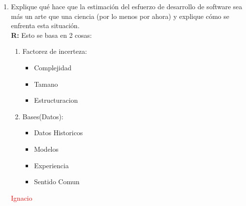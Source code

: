 \begin{enumerate}
	\item Explique qué hace que la estimación del esfuerzo de desarrollo de software sea más un arte que una ciencia (por lo menos por ahora) y explique cómo se enfrenta esta situación.\\
	\textbf{R:} Esto se basa en 2 cosas:
                \begin{enumerate}
                        \item Factorez de incerteza:
				\begin{itemize}
					\item Complejidad
					\item Tamano
					\item Estructuracion
				\end{itemize}

                        \item Bases(Datos):
                                \begin{itemize}
                                        \item Datos Historicos
                                        \item Modelos
                                        \item Experiencia
					\item Sentido Comun
                                \end{itemize}
                \end{enumerate}
	\textcolor{red}{Ignacio}


\end{enumerate}
